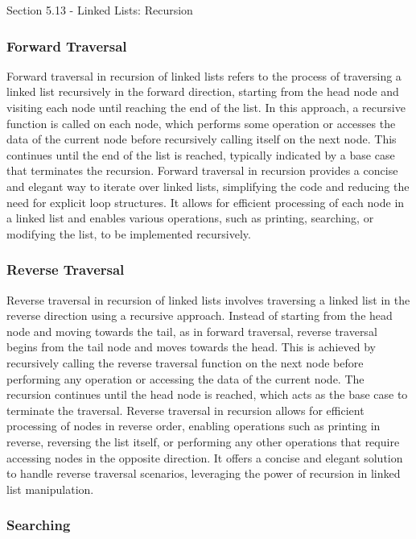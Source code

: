 \begin{notes}{Section 5.13 - Linked Lists: Recursion}
    \subsubsection*{Forward Traversal}

    Forward traversal in recursion of linked lists refers to the process of traversing a linked list recursively in the forward direction, starting from the head node and visiting each node until reaching the end of the list. In this approach, a recursive function is called on each node, which performs some operation or accesses the data of the current node before 
    recursively calling itself on the next node. This continues until the end of the list is reached, typically indicated by a base case that terminates the recursion. Forward traversal in recursion provides a concise and elegant way to iterate over linked lists, simplifying the code and reducing the need for explicit loop structures. It allows for efficient processing 
    of each node in a linked list and enables various operations, such as printing, searching, or modifying the list, to be implemented recursively.
    
    \subsubsection*{Reverse Traversal}
    
    Reverse traversal in recursion of linked lists involves traversing a linked list in the reverse direction using a recursive approach. Instead of starting from the head node and moving towards the tail, as in forward traversal, reverse traversal begins from the tail node and moves towards the head. This is achieved by recursively calling the reverse traversal function 
    on the next node before performing any operation or accessing the data of the current node. The recursion continues until the head node is reached, which acts as the base case to terminate the traversal. Reverse traversal in recursion allows for efficient processing of nodes in reverse order, enabling operations such as printing in reverse, reversing the list itself, 
    or performing any other operations that require accessing nodes in the opposite direction. It offers a concise and elegant solution to handle reverse traversal scenarios, leveraging the power of recursion in linked list manipulation.
    
    \subsubsection*{Searching}
    

\end{notes}

